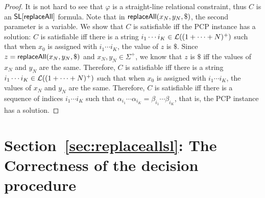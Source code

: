 \begin{proof}
	It is not hard to see that $\varphi$ is a straight-line relational constraint, thus $C$ is an $\mathsf{SL}[\mathsf{replaceAll}]$ formula. Note that in $\mathsf{replaceAll}(x_N, y_N, \$)$, the second parameter is a variable. We show that $C$ is satisfiable iff the PCP instance has a solution: $C$ is satisfiable iff there is a string $i_1 \cdots i_K \in \mathcal{L}((1 + \cdots + N)^+)$ such that when $x_0$ is assigned with $i_1 \cdots i_K$, the value of $z$ is $\$$.
	Since $z = \mathsf{replaceAll}(x_N, y_N, \$)$ and $x_N, y_N \in \Sigma^+$, we know that $z$ is $\$$ iff the values of $x_N$ and $y_N$ are the same. Therefore, $C$ is satisfiable iff there is a string $i_1 \cdots i_K \in \mathcal{L}((1 + \cdots + N)^+)$ such that when $x_0$ is assigned with $i_1 \cdots i_K$, the values of $x_N$ and $y_N$ are the same. Therefore, $C$ is satisfiable iff there is a sequence of indices $i_1 \cdots i_K$ such that $\alpha_{i_1} \cdots \alpha_{i_K} = \beta_{i_1} \cdots \beta_{i_K}$, that is, the PCP instance has a solution.
\end{proof}

\def\refsecreplaceallsl{\ref{sec:replaceallsl}}

\section{Section~\protect\refsecreplaceallsl: The Correctness of the decision procedure}
\label{sec:dp-sl-correctness}


